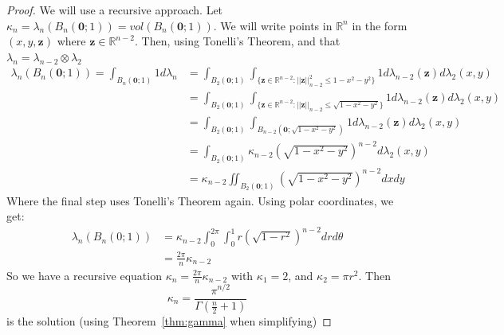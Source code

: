 \documentclass{article}
\theoremstyle{plain}
\theoremstyle{definition}
\theoremstyle{remark}
\begin{document}
\begin{proof}
    We will use a recursive approach. Let $\kappa_n = \lambda_n(B_n(\mathbf{0};1)) = vol(B_n(\mathbf{0};1))$. We will write points in $\mathbb{R}^n$ in the form $(x,y,\mathbf{z})$ where $\mathbf{z}\in \mathbb{R}^{n-2}$. Then, using Tonelli's Theorem, and that $\lambda _n = \lambda _{n-2} \otimes \lambda _2$
    \begin{align*}
        \lambda_n(B_n(\mathbf{0};1)) = \int _{B_n(\mathbf{0};1)} 1d \lambda _n & = \int_{B_2(\mathbf{0};1)} \int_{\{\mathbf{z} \in \mathbb{R}^{n-2}:||\mathbf{z}||_{n-2}^2 \le1-x^2-y^2 \}} 1d\lambda _{n-2}(\mathbf{z}) d\lambda _2(x,y) \\ & = \int_{B_2(\mathbf{0};1)} \int_{\{\mathbf{z} \in \mathbb{R}^{n-2}:||\mathbf{z}||_{n-2} \le \sqrt{1-x^2-y^2} \}} 1d\lambda _{n-2}(\mathbf{z}) d\lambda _2(x,y)
        \\ & = \int_{B_2(\mathbf{0};1)} \int_{B_{n-2}(\mathbf{0};\sqrt{1-x^2-y^2})} 1d\lambda _{n-2}(\mathbf{z}) d\lambda _2(x,y)
        \\ & = \int_{B_2(\mathbf{0};1)} \kappa _{n-2} \left(\sqrt{1-x^2-y^2} \right ) ^{n-2}d\lambda _2(x,y)
        \\ & = \kappa _{n-2}\iint _{B_2(\mathbf{0};1)} \left ( \sqrt{1-x^2-y^2} \right )^{n-2} dxdy
    \end{align*}
    Where the final step uses Tonelli's Theorem again. Using polar coordinates, we get:
    \begin{align*}
        \lambda _n(B_n(0;1)) &= \kappa _{n-2}\int _{0}^{2 \pi } \int _{0}^1 r\left (\sqrt{1-r^2} \right )^{n-2} drd\theta \\ & = \frac{2\pi }{n} \kappa _{n-2}
    \end{align*}
    So we have a recursive equation $\kappa_{n} = \frac{2\pi }{n} \kappa _{n-2}$ with $\kappa_1 = 2$, and $\kappa_2 = \pi r^2$. Then \[\kappa _n = \frac{\pi ^{n/2}}{\Gamma (\frac{n}{2}+1)}\] is the solution (using Theorem~\ref{thm:gamma} when simplifying)
    
\end{proof}
\end{document}
